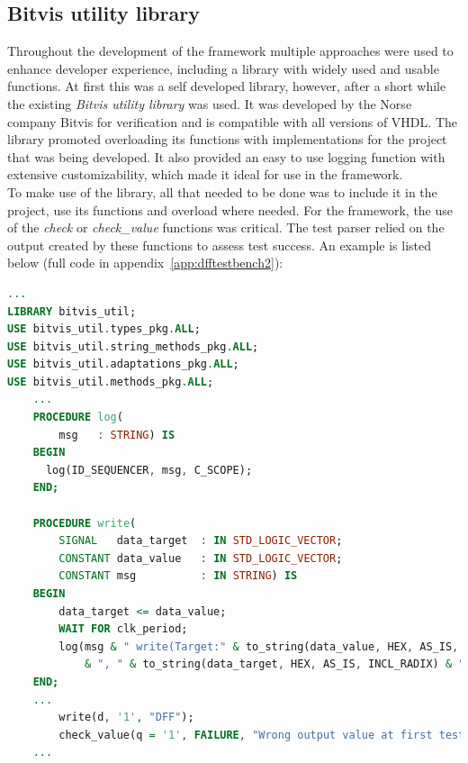 \documentclass[11pt,british]{article}
\begin{document}
\subsection{Bitvis utility library}
\label{subsec:bitvis}
Throughout the development of the framework multiple approaches were used to enhance developer experience, including a library with widely used and usable functions. At first this was a self developed library, however, after a short while the existing \emph{Bitvis utility library} was used. It was developed by the Norse company Bitvis for verification and is compatible with all versions of \gls{VHDL}. \cite{bitvis} The library promoted overloading its functions with implementations for the project that was being developed. It also provided an easy to use logging function with extensive customizability, which made it ideal for use in the framework.
\\[\baselineskip]
To make use of the library, all that needed to be done was to include it in the project, use its functions and overload where needed. For the framework, the use of the \emph{check} or \emph{check\_value} functions was critical. The test parser relied on the output created by these functions to assess test success. An example is listed below (full code in appendix~\ref{app:dfftestbench2}):
\begin{lstlisting}[language=VHDL, tabsize=4, frame=single, framesep=2mm, belowskip=8pt, aboveskip=8pt, showstringspaces=false, basicstyle=\footnotesize]
...
LIBRARY bitvis_util;
USE bitvis_util.types_pkg.ALL;
USE bitvis_util.string_methods_pkg.ALL;
USE bitvis_util.adaptations_pkg.ALL;
USE bitvis_util.methods_pkg.ALL;
	...
	PROCEDURE log(
    	msg   : STRING) IS
    BEGIN
      log(ID_SEQUENCER, msg, C_SCOPE);
    END;
    
	PROCEDURE write(
    	SIGNAL   data_target  : IN STD_LOGIC_VECTOR;
    	CONSTANT data_value   : IN STD_LOGIC_VECTOR;
    	CONSTANT msg          : IN STRING) IS
    BEGIN
    	data_target <= data_value;
    	WAIT FOR clk_period;
    	log(msg & " write(Target:" & to_string(data_value, HEX, AS_IS, INCL_RADIX) 
    		& ", " & to_string(data_target, HEX, AS_IS, INCL_RADIX) & ")";);
    END;
	...
		write(d, '1', "DFF");
		check_value(q = '1', FAILURE, "Wrong output value at first test");
	...
\end{lstlisting}

\end{document}
